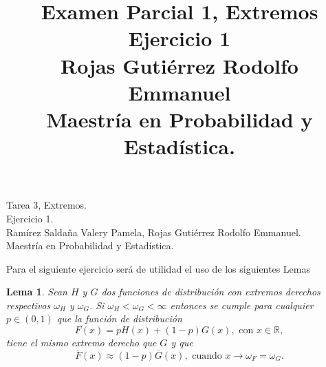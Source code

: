 \documentclass[10.5pt,notitlepage]{article}
\title{Examen Parcial 1, Extremos \\
Ejercicio 1\\
Rojas Gutiérrez Rodolfo Emmanuel\\ 
Maestría en Probabilidad y Estadística.}
\author{}
\newcommand{\RR}{\mathbb{R}}
\theoremstyle{plain}
\newtheorem{lem}[thm]{Lema} %
\begin{document}
\begin{flushleft}
Tarea 3, Extremos.\\
Ejercicio 1.\\   
Ramírez Saldaña Valery Pamela, Rojas Gutiérrez Rodolfo Emmanuel.\\
Maestría en Probabilidad y Estadística.
\end{flushleft}
Para el siguiente ejercicio será de utilidad el uso de los siguientes Lemas
\begin{lem}\label{lem.1}
Sean \(H\) y \(G\) dos funciones de distribución con extremos derechos respectivos \(\omega_H\) y \(\omega_G\). Si \(\omega_H < \omega_G < \infty\) entonces se cumple para cualquier \(p \in (0,1)\) que la función de distribución 
\[
F(x) = p H(x) + (1- p)G(x), \text{ con } x \in \RR,
\]
tiene el mismo extremo derecho que \(G\) y que 
\begin{equation*}
    \overline{F}(x) \approx (1 - p) \overline{G}(x), \text{ cuando } x \to \omega_{F} = \omega_{G}.
\end{equation*}
\end{lem}
\end{document}

